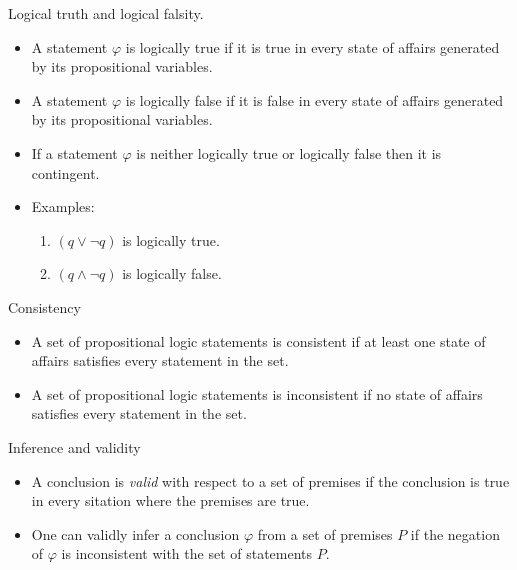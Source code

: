 \documentclass[
  ignorenonframetext,
]{beamer}
\providecommand{\tightlist}{%
  \setlength{\itemsep}{0pt}\setlength{\parskip}{0pt}}
\begin{document}
\begin{frame}{Logical truth and logical falsity.}
\protect\hypertarget{logical-truth-and-logical-falsity.}{}

\begin{itemize}[<+->]
\item
  A statement \(\varphi\) is logically true if it is true in every state
  of affairs generated by its propositional variables.
\item
  A statement \(\varphi\) is logically false if it is false in every
  state of affairs generated by its propositional variables.
\item
  If a statement \(\varphi\) is neither logically true or logically
  false then it is contingent.
\item
  Examples:

  \begin{enumerate}[<+->]
  \tightlist
  \item
    \((q \vee {\neg}q)\) is logically true.
  \item
    \((q \wedge {\neg}q)\) is logically false.
  \end{enumerate}
\end{itemize}

\end{frame}

\begin{frame}{Consistency}
\protect\hypertarget{consistency}{}

\begin{itemize}[<+->]
\item
  A set of propositional logic statements is consistent if at least one
  state of affairs satisfies every statement in the set.
\item
  A set of propositional logic statements is inconsistent if no state of
  affairs satisfies every statement in the set.
\end{itemize}

\end{frame}

\begin{frame}{Inference and validity}
\protect\hypertarget{inference-and-validity}{}

\begin{itemize}[<+->]
\tightlist
\item
  A conclusion is \emph{valid} with respect to a set of premises if the
  conclusion is true in every sitation where the premises are true.
\item
  One can validly infer a conclusion \(\varphi\) from a set of premises
  \(P\) if the negation of \(\varphi\) is inconsistent with the set of
  statements \(P\).
\end{itemize}

\end{frame}
\end{document}
